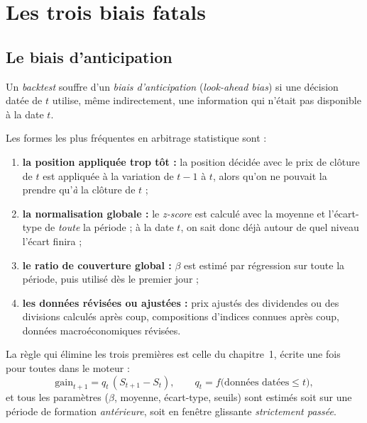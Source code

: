 \section{Les trois biais fatals}

\subsection{Le biais d'anticipation}

\begin{definition}
Un \emph{backtest} souffre d'un \emph{biais d'anticipation} (\emph{look-ahead bias}) si une décision datée de $t$ utilise, même indirectement, une information qui n'était pas disponible à la date $t$.
\end{definition}

Les formes les plus fréquentes en arbitrage statistique sont :
\begin{enumerate}
\item \textbf{la position appliquée trop tôt :} la position décidée avec le prix de clôture de $t$ est appliquée à la variation de $t-1$ à $t$, alors qu'on ne pouvait la prendre qu'\emph{à} la clôture de $t$ ;
\item \textbf{la normalisation globale :} le \emph{z-score} est calculé avec la moyenne et l'écart-type de \emph{toute} la période ; à la date $t$, on \og sait\fg{} donc déjà autour de quel niveau l'écart finira ;
\item \textbf{le ratio de couverture global :} $\beta$ est estimé par régression sur toute la période, puis utilisé dès le premier jour ;
\item \textbf{les données révisées ou ajustées :} prix ajustés des dividendes ou des divisions calculés après coup, compositions d'indices connues après coup, données macroéconomiques révisées.
\end{enumerate}

La règle qui élimine les trois premières est celle du chapitre~1, écrite une fois pour toutes dans le moteur :
\begin{equation}\label{c16:eq:pnl}
\text{gain}_{t+1} = q_t\,(S_{t+1} - S_t), \qquad q_t = f\big(\text{données datées} \le t\big),
\end{equation}
et tous les paramètres ($\beta$, moyenne, écart-type, seuils) sont estimés soit sur une période de formation \emph{antérieure}, soit en fenêtre glissante \emph{strictement passée}.

